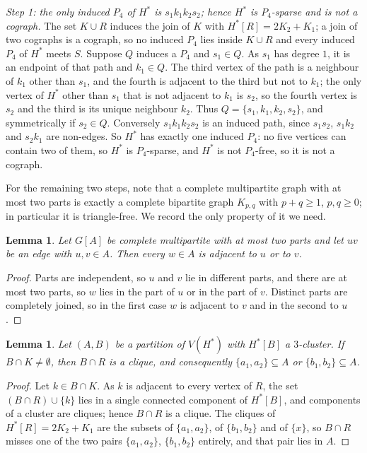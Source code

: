 \documentclass[11pt]{amsart}
\newtheorem{lemma}[theorem]{Lemma}
\theoremstyle{definition}
\theoremstyle{remark}
\newcommand{\Hstar}{H^{*}}
\newcommand{\Pfour}{P_{4}}
\begin{document}
\medskip
\noindent\emph{Step 1: the only induced $\Pfour$ of $\Hstar$ is $s_1k_1k_2s_2$; hence $\Hstar$
is $P_4$-sparse and is not a cograph.}
The set $K\cup R$ induces the join of $K$ with $\Hstar[R]=2K_2+K_1$; a join of two cographs is
a cograph, so no induced $P_4$ lies inside $K\cup R$ and every induced $P_4$ of $\Hstar$ meets
$S$. Suppose $Q$ induces a $P_4$ and $s_1\in Q$. As $s_1$ has degree $1$, it is an endpoint of
that path and $k_1\in Q$. The third vertex of the path is a neighbour of $k_1$ other than
$s_1$, and the fourth is adjacent to the third but not to $k_1$; the only vertex of $\Hstar$
other than $s_1$ that is not adjacent to $k_1$ is $s_2$, so the fourth vertex is $s_2$ and the
third is its unique neighbour $k_2$. Thus $Q=\{s_1,k_1,k_2,s_2\}$, and symmetrically if
$s_2\in Q$. Conversely $s_1k_1k_2s_2$ is an induced path, since $s_1s_2$, $s_1k_2$ and
$s_2k_1$ are non-edges. So $\Hstar$ has exactly one induced $P_4$: no five vertices can
contain two of them, so $\Hstar$ is $P_4$-sparse, and $\Hstar$ is not $P_4$-free, so it is not
a cograph.

\medskip
For the remaining two steps, note that a complete multipartite graph with at most two parts is
exactly a complete bipartite graph $K_{p,q}$ with $p+q\ge1$, $p,q \ge 0$; in particular it is
triangle-free. We record the only property of it we need.

\begin{lemma}\label{lem:cb}
Let $G[A]$ be complete multipartite with at most two parts and let $uv$ be an edge with
$u,v\in A$. Then every $w\in A$ is adjacent to $u$ or to $v$.
\end{lemma}

\begin{proof}
Parts are independent, so $u$ and $v$ lie in different parts, and there are at most two parts,
so $w$ lies in the part of $u$ or in the part of $v$. Distinct parts are completely joined, so
in the first case $w$ is adjacent to $v$ and in the second to $u$.
\end{proof}

\begin{lemma}\label{lem:B}
Let $(A,B)$ be a partition of $V(\Hstar)$ with $\Hstar[B]$ a $3$-cluster. If $B\cap K \ne
\emptyset$, then $B\cap R$ is a clique, and consequently $\{a_1,a_2\}\subseteq A$ or
$\{b_1,b_2\}\subseteq A$.
\end{lemma}

\begin{proof}
Let $k\in B\cap K$. As $k$ is adjacent to every vertex of $R$, the set $(B\cap R)\cup\{k\}$
lies in a single connected component of $\Hstar[B]$, and components of a cluster are cliques;
hence $B \cap R$ is a clique. The cliques of $\Hstar[R]=2K_2+K_1$ are the subsets of
$\{a_1,a_2\}$, of $\{b_1,b_2\}$ and of $\{x\}$, so $B\cap R$ misses one of the two pairs
$\{a_1,a_2\}$, $\{b_1,b_2\}$ entirely, and that pair lies in $A$.
\end{proof}
\end{document}
